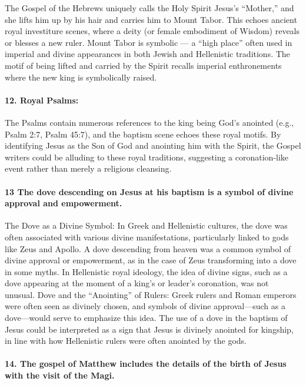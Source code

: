 The Gospel of the Hebrews uniquely calls the Holy Spirit Jesus's ``Mother,'' and she lifts him up by his hair and carries him to Mount Tabor.
This echoes ancient royal investiture scenes, where a deity (or female embodiment of Wisdom) reveals or blesses a new ruler.
Mount Tabor is symbolic --- a ``high place'' often used in imperial and divine appearances in both Jewish and Hellenistic traditions.
The motif of being lifted and carried by the Spirit recalls imperial enthronements where the new king is symbolically raised.

\paragraph{12.
Royal Psalms:}\label{par:royal-psalms}

The Psalms contain numerous references to the king being God's anointed (e.g., Psalm 2:7, Psalm 45:7), and the baptism scene echoes these royal motifs.
By identifying Jesus as the Son of God and anointing him with the Spirit, the Gospel writers could be alluding to these royal traditions, suggesting a coronation-like event rather than merely a religious cleansing.

\paragraph{13 The dove descending on Jesus at his baptism is a symbol of divine approval and empowerment.}\label{par:the-dove-descending-on-jesus-at-his-baptism-is-a-symbol-of-divine-approval-and-empowerment.}

The Dove as a Divine Symbol: In Greek and Hellenistic cultures, the dove was often associated with various divine manifestations, particularly linked to gods like Zeus and Apollo.
A dove descending from heaven was a common symbol of divine approval or empowerment, as in the case of Zeus transforming into a dove in some myths.
In Hellenistic royal ideology, the idea of divine signs, such as a dove appearing at the moment of a king's or leader's coronation, was not unusual.
Dove and the ``Anointing'' of Rulers: Greek rulers and Roman emperors were often seen as divinely chosen, and symbols of divine approval---such as a dove---would serve to emphasize this idea.
The use of a dove in the baptism of Jesus could be interpreted as a sign that Jesus is divinely anointed for kingship, in line with how Hellenistic rulers were often anointed by the gods.

\paragraph{14.
The gospel of Matthew includes the details of the birth of Jesus with the visit of the Magi.}\label{par:the-gospel-of-matthew-includes-the-details-of-the-birth-of-jesus-with-the-visit-of-the-magi.}

